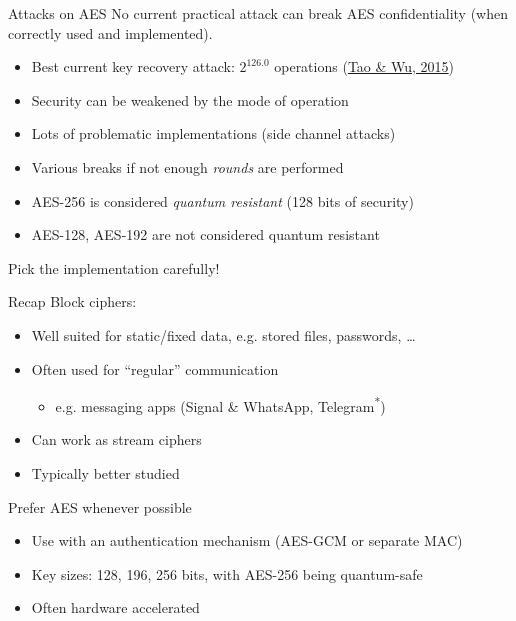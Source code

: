 \begin{frame}{Attacks on AES}
  No current practical attack can break AES confidentiality (when correctly used and implemented).

  \begin{itemize}[<+(1)->]
    \item Best current key recovery attack: $2^{126.0}$ operations (\href{https://doi.org/10.1007\%2F978-3-319-19962-7_3}{Tao \& Wu, 2015})
    \item Security can be weakened by the mode of operation
    \item Lots of problematic implementations (side channel attacks)
    \item Various breaks if not enough \emph{rounds} are performed
    \item AES-256 is considered \emph{quantum resistant} (128 bits of security)
    \item AES-128, AES-192 are not considered quantum resistant
  \end{itemize}

  \pause
  Pick the implementation carefully!
\end{frame}

\begin{frame}{Recap}
  Block ciphers:
  \begin{itemize}[<+(1)->]
    \item Well suited for static/fixed data, e.g. stored files, passwords, \dots
    \item Often used for \enquote{regular} communication
    \begin{itemize}
      \item e.g. messaging apps (Signal \& WhatsApp, Telegram\textsuperscript{*})
    \end{itemize}
    \item Can work as stream ciphers
    \item Typically better studied
  \end{itemize}

  \vspace*{1em}

  \pause
  Prefer AES whenever possible
  \begin{itemize}
    \item Use with an authentication mechanism (AES-GCM or separate MAC)
    \item Key sizes: 128, 196, 256 bits, with AES-256 being quantum-safe
    \item Often hardware accelerated
  \end{itemize}
\end{frame}

